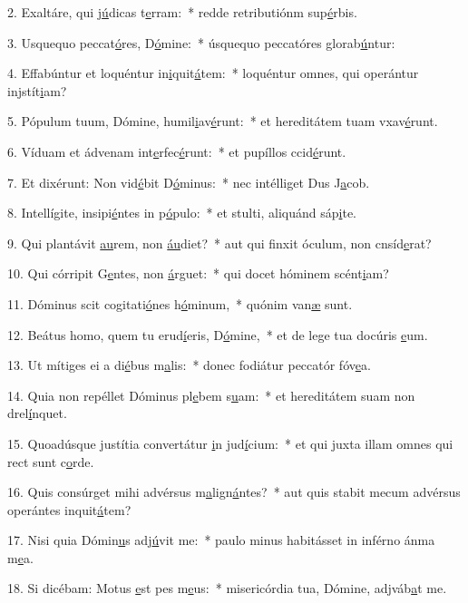 2. Exaltáre, qui j\uline{ú}dicas t\uline{e}rram:~* redde retributiónm sup\uline{é}rbis.\par 
3. Usquequo peccat\uline{ó}res, D\uline{ó}mine:~* úsquequo peccatóres glorab\uline{ú}ntur:\par 
4. Effabúntur et loquéntur in\uline{i}quit\uline{á}tem:~* loquéntur omnes, qui operántur injstít\uline{i}am?\par 
5. Pópulum tuum, Dómine, humil\uline{i}av\uline{é}runt:~* et hereditátem tuam vxav\uline{é}runt.\par 
6. Víduam et ádvenam int\uline{e}rfec\uline{é}runt:~* et pupíllos ccid\uline{é}runt.\par 
7. Et dixérunt: Non vid\uline{é}bit D\uline{ó}minus:~* nec intélliget Dus J\uline{a}cob.\par 
8. Intellígite, insipi\uline{é}ntes in p\uline{ó}pulo:~* et stulti, aliquánd sáp\uline{i}te.\par 
9. Qui plantávit \uline{au}rem, non \uline{áu}diet?~* aut qui finxit óculum, non cnsíd\uline{e}rat?\par 
10. Qui córripit G\uline{e}ntes, non \uline{á}rguet:~* qui docet hóminem scént\uline{i}am?\par 
11. Dóminus scit cogitati\uline{ó}nes h\uline{ó}minum,~* quónim van\uline{æ} sunt.\par 
12. Beátus homo, quem tu erud\uline{í}eris, D\uline{ó}mine,~* et de lege tua docúris \uline{e}um.\par 
13. Ut mítiges ei a di\uline{é}bus m\uline{a}lis:~* donec fodiátur peccatór fóv\uline{e}a.\par 
14. Quia non repéllet Dóminus pl\uline{e}bem s\uline{u}am:~* et hereditátem suam non drel\uline{í}nquet.\par 
15. Quoadúsque justítia convertátur \uline{i}n jud\uline{í}cium:~* et qui juxta illam omnes qui rect sunt c\uline{o}rde.\par 
16. Quis consúrget mihi advérsus m\uline{a}lign\uline{á}ntes?~* aut quis stabit mecum advérsus operántes inquit\uline{á}tem?\par 
17. Nisi quia Dómin\uline{u}s adj\uline{ú}vit me:~* paulo minus habitásset in inférno ánma m\uline{e}a.\par 
18. Si dicébam: Motus \uline{e}st pes m\uline{e}us:~* misericórdia tua, Dómine, adjváb\uline{a}t me.\par 

